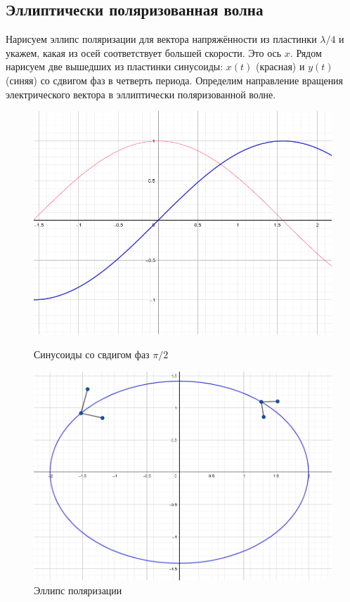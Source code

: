 \documentclass[a4paper, 12pt]{article}
\begin{document}
\subsection{Эллиптически поляризованная волна}

Нарисуем эллипс поляризации для вектора напряжённости из пластинки $ \lambda/4 $ и укажем, какая из осей соответствует большей скорости. Это ось $ x $. Рядом нарисуем две вышедших из пластинки синусоиды: $ x(t) $ (красная) и $ y(t) $ (синяя) со сдвигом фаз в четверть периода. Определим направление вращения электрического вектора в эллиптически поляризованной волне.

\begin{figure}[!h]
	\begin{minipage}{0.48\linewidth}
		\includegraphics[width=\linewidth]{image1.png}
		\centering
		\caption{Синусоиды со свдигом фаз $\pi/2$}
	\end{minipage}
	\hfill
	\begin{minipage}{0.49\linewidth}
		\centering
		\includegraphics[width=\linewidth]{ellips.png}
		\caption{Эллипс поляризации}
	\end{minipage}
\end{figure}
\end{document}
